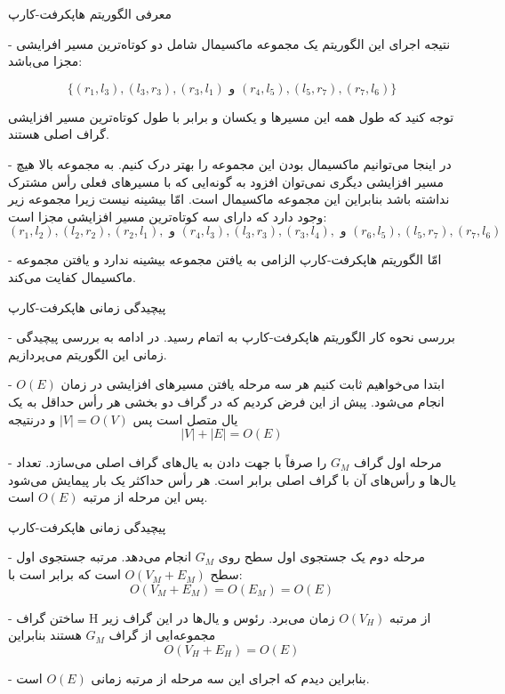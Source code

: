 \begin{itemframe}{‌معرفی الگوریتم هاپکرفت-کارپ}
\item[-]
نتیجه اجرای این الگوریتم یک مجموعه ماکسیمال شامل دو کوتاه‌ترین مسیر‌ افرایشی مجزا می‌باشد:

$$
\{(r_1, l_3), (l_3, r_3), (r_3, l_1) \text{ و } (r_4, l_5), (l_5, r_7), (r_7, l_6) \}
$$

توجه کنید که طول همه این مسیر‌ها و یکسان و برابر با طول کوتاه‌ترین مسیر افزایشی گراف اصلی هستند.

\item[-]
در اینجا می‌توانیم ماکسیمال بودن این مجموعه را بهتر درک کنیم. به مجموعه بالا هیچ مسیر افزایشی دیگری نمی‌توان افزود به گونه‌ایی که با مسیرهای فعلی رأس مشترک نداشته باشد بنابراین این مجموعه ماکسیمال است. امّا بیشینه نیست زیرا مجموعه زیر وجود دارد که دارای سه کوتاه‌ترین مسیر افزایشی مجزا است:
$$
(r_1, l_2) ,(l_2, r_2), (r_2, l_1), \text{ و } (r_4, l_3), (l_3, r_3), (r_3, l_4), \text{ و } (r_6, l_5),  (l_5, r_7),  (r_7, l_6)
$$

\item[-]
امّا الگوریتم هاپکرفت-کارپ الزامی به یافتن مجموعه بیشینه ندارد و یافتن مجموعه ماکسیمال کفایت می‌کند.

\end{itemframe}


\begin{itemframe}{‌پیچیدگی زمانی هاپکرفت-کارپ}
\item[-]
بررسی نحوه کار الگوریتم هاپکرفت-کارپ به اتمام رسید. در ادامه به بررسی پیچیدگی زمانی این الگوریتم می‌پردازیم.
\item[-]
ابتدا می‌خواهیم ثابت کنیم هر سه مرحله یافتن مسیرهای افزایشی در زمان $O(E)$ انجام می‌شود. پیش از این فرض کردیم که در گراف دو بخشی هر رأس حداقل به یک یال متصل است پس
$|V| = O(V)$
و درنتیجه
$$|V| + |E| = O(E)$$

\item[-]
مرحله اول گراف
$G_M$
را صرفاً با جهت دادن به یال‌های گراف اصلی می‌سازد. تعداد یال‌ها و رأس‌های آن با گراف اصلی برابر است. هر رأس حداکثر یک بار پیمایش می‌شود پس این مرحله از مرتبه $O(E)$ است.
\end{itemframe}


\begin{itemframe}{‌پیچیدگی زمانی هاپکرفت-کارپ}
\item[-]
مرحله دوم یک جستجوی اول سطح روی
$G_M$
انجام می‌دهد. مرتبه جستجوی اول سطح
$O(V_M+E_M)$
است که برابر است با:
$$O(V_M+E_M) = O(E_M) = O(E)$$

\item[-]
ساختن گراف H از مرتبه
$O(V_H)$
زمان می‌برد. رئوس و یال‌ها در این گراف زیر مجموعه‌ایی از گراف $G_M$ هستند بنابراین
$$O(V_H+E_H) = O(E)$$
\item[-]
بنابراین دیدم که اجرای این سه مرحله از مرتبه زمانی
$O(E)$
است.
\end{itemframe}


